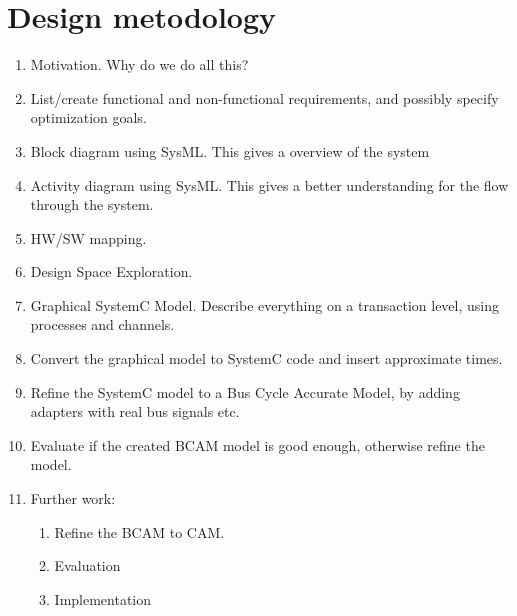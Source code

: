 \chapter{Design metodology}

\begin{enumerate}
\item Motivation. Why do we do all this?
\item List/create functional and non-functional requirements, and possibly specify optimization goals.
\item Block diagram using SysML. This gives a overview of the system
\item Activity diagram using SysML. This gives a better understanding for the flow through the system.
\item HW/SW mapping.
\item Design Space Exploration.
\item Graphical SystemC Model. Describe everything on a transaction level, using processes and channels.
\item Convert the graphical model to SystemC code and insert approximate times.
\item Refine the SystemC model to a Bus Cycle Accurate Model, by adding adapters with real bus signals etc.
\item Evaluate if the created BCAM model is good enough, otherwise refine the model.
\item Further work:
\begin{enumerate}
\item Refine the BCAM to CAM.
\item Evaluation
\item Implementation
\end{enumerate}
\end{enumerate}

